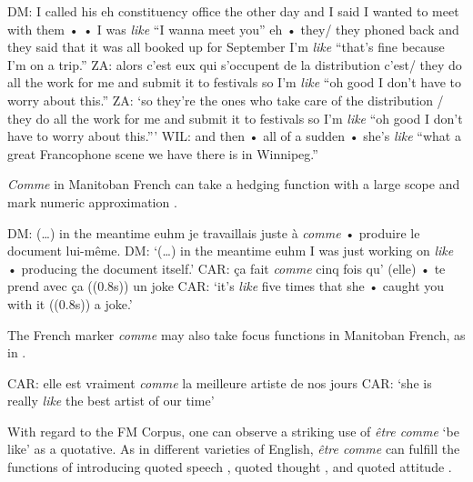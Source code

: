 \documentclass[output=paper]{langscibook}
\begin{document}
\begin{exe}
    \ex\label{hennecke:ex:5} DM: I called his eh constituency office the other day and I said I wanted to meet with them • • I was \textit{like} “I wanna meet you” eh • they/ they phoned back and they said that it was all booked up for September I’m \textit{like} “that’s fine because I’m on a trip.”
    \ex\label{hennecke:ex:6} ZA: alors c’est eux qui s’occupent de la distribution c’est/ they do all the work for me and submit it to festivals so I’m \textit{like} “oh good I don’t have to worry about this.”
    \glt ZA: ‘so they’re the ones who take care of the distribution / they do all the work for me and submit it to festivals so I’m \textit{like} “oh good I don’t have to worry about this.”’
    \ex\label{hennecke:ex:7} WIL: and then • all of a sudden • she’s \textit{like} “what a great Francophone scene we have there is in Winnipeg.”
\end{exe}

\noindent
\textit{Comme} in Manitoban French can take a hedging function with a large scope  and mark numeric approximation .

\begin{exe}
    \ex\label{hennecke:ex:8} DM: (\dots) in the meantime euhm je travaillais juste à \textit{comme} • produire le document lui-même.
    \glt DM: ‘(…) in the meantime euhm I was just working on \textit{like} • producing the document itself.’
    \ex\label{hennecke:ex:9} CAR: ça fait \textit{comme} cinq fois qu’ (elle) • te prend avec ça ((0.8s)) un joke
    \glt CAR: ‘it’s \textit{like} five times that she • caught you with it ((0.8s)) a joke.’
\end{exe}

\noindent
The French marker \textit{comme} may also take focus functions in Manitoban French, as in .

\begin{exe}
    \ex\label{hennecke:ex:10} CAR: elle est vraiment \textit{comme} la meilleure artiste de nos jours
    \glt CAR: ‘she is really \textit{like} the best artist of our time’
\end{exe}

\noindent
With regard to the FM Corpus, one can observe a striking use of \textit{être comme} ‘be like’ as a quotative. As in different varieties of English, \textit{être comme} can fulfill the functions of introducing quoted speech , quoted thought , and quoted attitude .
\end{document}
